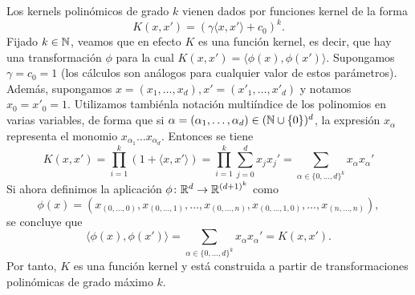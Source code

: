 \documentclass{book}
\begin{document}
\begin{ex}
	Los kernels polinómicos de grado $k$ vienen dados por funciones kernel de la forma
	\[ K(x,x') = (\gamma \langle x,x' \rangle + c_0)^k. \]
	Fijado $k \in \mathbb{N}$, veamos que en efecto $K$ es una función kernel, es decir, que hay una transformación $\phi$ para la cual $K(x,x') = \langle \phi(x),\phi(x') \rangle$. Supongamos $\gamma = c_0 = 1$ (los cálculos son análogos para cualquier valor de estos parámetros). Además, supongamos $x = (x_1,\dots,x_d), x' = (x'_1,\dots,x'_d)$ y notamos $x_0 = x'_0 = 1$. Utilizamos tambiénla notación multiíndice de los polinomios en varias variables, de forma que si $\alpha = (\alpha_1,\dots,\alpha_d) \in (\mathbb{N}\cup\{0\})^d$, la expresión $x_{\alpha}$ representa el monomio $x_{\alpha_1}\dots x_{\alpha_d}$. Entonces se tiene
	\begin{equation*}
		K(x,x') = \prod_{i=1}^k (1 + \langle x, x' \rangle) 
				= \prod_{i=1}^k \sum_{j=0}^d x_jx_j' 
				= \sum_{\alpha \in \{0,\dots,d\}^k} x_{\alpha} x_{\alpha}'
	\end{equation*}
	Si ahora definimos la aplicación $\phi \colon \mathbb{R}^d \to \mathbb{R}^{(d+1)^k}$ como
	\[\phi(x) = (x_{(0,\dots,0)},x_{(0,\dots,1)},\dots,x_{(0,\dots,n)},x_{(0,\dots,1,0)},\dots,x_{(n,\dots,n)}),\]
	se concluye que 
	\[ \langle \phi(x), \phi(x') \rangle = \sum_{\alpha \in \{0,\dots,d\}^k} x_{\alpha} x_{\alpha}' = K(x,x'). \]
	Por tanto, $K$ es una función kernel y está construida a partir de transformaciones polinómicas de grado máximo $k$.
\end{ex}
\end{document}
